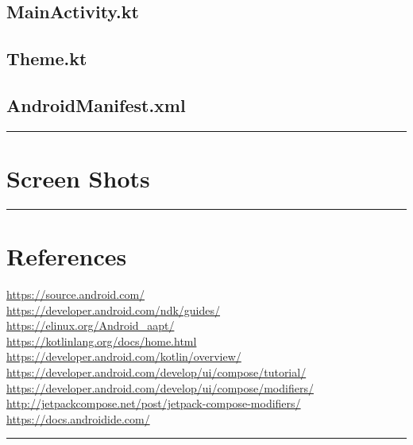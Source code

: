 \documentclass[12pt,oneside]{book}
\begin{document}
\section{MainActivity.kt}
\newpage
\section{Theme.kt}
\newpage
\section{AndroidManifest.xml}
\vfill \rule{\textwidth}{0.4pt}

\chapter{Screen Shots}
\vfill \rule{\textwidth}{0.4pt}

\chapter{References}
\url{https://source.android.com/} \\
\url{https://developer.android.com/ndk/guides/} \\
\url{https://elinux.org/Android_aapt/} \\
\url{https://kotlinlang.org/docs/home.html} \\
\url{https://developer.android.com/kotlin/overview/} \\
\url{https://developer.android.com/develop/ui/compose/tutorial/} \\
\url{https://developer.android.com/develop/ui/compose/modifiers/} \\
\url{http://jetpackcompose.net/post/jetpack-compose-modifiers/} \\
\url{https://docs.androidide.com/}
\vfill \rule{\textwidth}{0.4pt}
\end{document}

